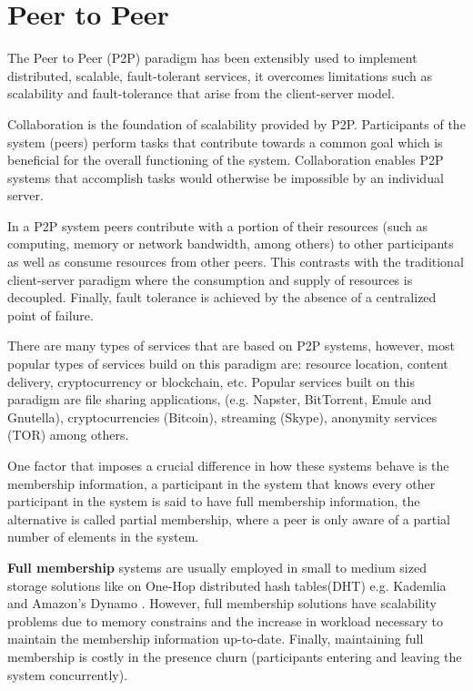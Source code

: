 \section{Peer to Peer} %
\label{sec:p2p}

The Peer to Peer (P2P) paradigm has been extensibly used to implement distributed, scalable, fault-tolerant services, it overcomes limitations such as scalability and fault-tolerance that arise from the client-server model. 

Collaboration is the foundation of scalability provided by P2P. Participants of the system (peers) perform tasks that contribute towards a common goal which is beneficial for the overall functioning of the system. Collaboration enables P2P systems that accomplish tasks would otherwise be impossible by an individual server.  %

In a P2P system peers contribute with a portion of their resources (such as computing, memory or network bandwidth, among others) to other participants as well as consume resources from other peers. This contrasts with the traditional client-server paradigm where the consumption and supply of resources is decoupled. Finally, fault tolerance is achieved by the absence of a centralized point of failure.

There are many types of services that are based on P2P systems, however, most popular types of services build on this paradigm are: resource location, content delivery, cryptocurrency or blockchain, etc. Popular services built on this paradigm are file sharing applications, (e.g. Napster, BitTorrent, Emule and Gnutella), cryptocurrencies (Bitcoin), streaming (Skype), anonymity services (TOR) among others. 

One factor that imposes a crucial difference in how these systems behave is the membership information, a participant in the system that knows every other participant in the system is said to have full membership information, the alternative is called partial membership, where a peer is only aware of a partial number of elements in the system.

\textbf{Full membership} systems are usually employed in small to medium sized storage solutions like on One-Hop distributed hash tables(DHT) e.g. Kademlia \cite{10.1007/3-540-45748-8_5} and Amazon's Dynamo \cite{decandia2007dynamo}. However, full membership solutions  have scalability problems due to memory constrains and the increase in workload necessary to maintain the membership information up-to-date. Finally, maintaining full membership is costly in the presence churn (participants entering and leaving the system concurrently). %

